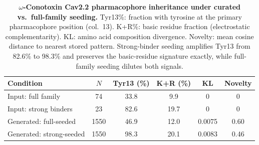 \documentclass{article}
\theoremstyle{definition}
\theoremstyle{remark}
\begin{document}
\begin{table}[p]
  \centering
  \caption{\textbf{$\omega$-Conotoxin Cav2.2 pharmacophore inheritance under curated vs.\
  full-family seeding.}
  Tyr13\%: fraction with tyrosine at the primary pharmacophore position (col.~13).
  K+R\%: basic residue fraction (electrostatic complementarity). KL: amino acid composition
  divergence. Novelty: mean cosine distance to nearest stored pattern. Strong-binder seeding
  amplifies Tyr13 from 82.6\% to 98.3\% and preserves the basic-residue signature exactly,
  while full-family seeding dilutes both signals.}
  \label{tab:conotoxin-pharmacophore}
  \small
  \begin{tabular}{lccccc}
    \toprule
    Condition & $N$ & Tyr13 (\%) & K+R (\%) & KL & Novelty \\
    \midrule
    Input: full family          &   74 & 33.8 &  9.9 & 0      & 0 \\
    Input: strong binders       &   23 & 82.6 & 19.7 & 0      & 0 \\
    Generated: full-seeded      & 1550 & 46.9 & 12.0 & 0.0075 & 0.60 \\
    Generated: strong-seeded    & 1550 & 98.3 & 20.1 & 0.0083 & 0.46 \\
    \bottomrule
  \end{tabular}
\end{table}
\end{document}
